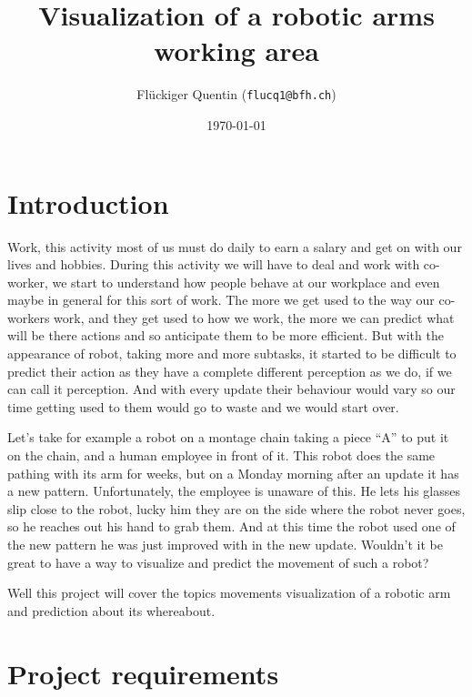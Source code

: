 \documentclass{scrartcl}
\begin{document}
\title{Visualization of a robotic arms working area}
\date{\today}   
\author{Flückiger Quentin (\texttt{flucq1@bfh.ch}) }

\clearpage
\maketitle

\tableofcontents


\clearpage

\section{Introduction}

Work, this activity most of us must do daily to earn a salary and get on with our lives and hobbies.
During this activity we will have to deal and work with co-worker, we start to understand how people behave at our workplace 
and even maybe in general for this sort of work. The more we get used to the way our co-workers work,
and they get used to how we work, the more we can predict what will be there actions and so anticipate them to be more efficient.
But with the appearance of robot, taking more and more subtasks, it started to be difficult to predict their action 
as they have a complete different perception as we do, if we can call it perception. 
And with every update their behaviour would vary so our time getting used to them would go to waste and we would start over. 

Let’s take for example a robot on a montage chain taking a piece “A” to put it on the chain, and a human employee in front of it. 
This robot does the same pathing with its arm for weeks, but on a Monday morning after an update it has a new pattern. 
Unfortunately, the employee is unaware of this. He lets his glasses slip close to the robot, lucky him they are on the side where the robot never goes, 
so he reaches out his hand to grab them. And at this time the robot used one of the new pattern he was just improved with in the new update. 
Wouldn’t it be great to have a way to visualize and predict the movement of such a robot?

Well this project will cover the topics movements visualization of a robotic arm and prediction about its whereabout. 


\clearpage

\section{Project requirements}
\end{document}
